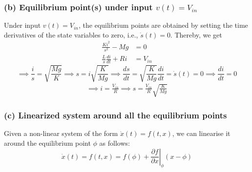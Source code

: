 \subsubsection*{(b) Equilibrium point(s) under input \(v(t)=V_{in}\)}

Under input \( v(t)=V_{in} \), the equilibrium points are obtained by setting the time derivatives of the state variables to zero, i.e., \( \dot s(t) = 0 \).
Thereby, we get
\begin{align*}
    \frac{Ki^2}{s^2} - Mg         & = 0      \\
    \frac{L}{s}\frac{di}{dt} + Ri & = V_{in}
\end{align*}
\begin{equation*}
    \implies
    \frac{i}{s} = \sqrt{\frac{Mg}{K}}
    \implies
    s = i \sqrt{\frac{K}{Mg}}
    \implies
    \frac{ds}{dt} = \sqrt{\frac{K}{Mg}} \frac{di}{dt} = \dot s(t) = 0
    \implies
    \frac{di}{dt} = 0
\end{equation*}
\begin{align*}
    \implies
    i = \frac{V_{in}}{R}
    \implies
    \boxed{
        s = \frac{V_{in}}{R} \sqrt{\frac{K}{Mg}}
    }
\end{align*}

\subsubsection*{(c) Linearized system around all the equilibrium points}

Given a non-linear system of the form \( \dot x(t) = f(t, x) \), we can linearise it around the equilibrium point \( \phi \) as follows:
\[
    \dot x(t) = f(t, x) = f(\phi) + \left. \frac{\partial f}{\partial x} \right|_{\phi} (x - \phi)
\]
